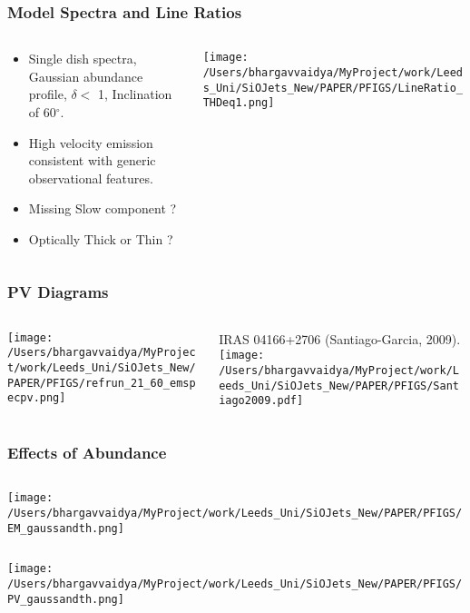 \documentclass[8pt,xcolor=dvipsnames]{beamer}
\begin{document}
\begin{frame}
\frametitle{Model Spectra and Line Ratios}
\begin{columns}[T]
\begin{column}{0.4\textwidth}
\begin{itemize}
\item Single dish spectra, Gaussian
  abundance profile, $\delta <$ 1, Inclination of 60$^{\circ}$. \\
\item High velocity emission consistent with generic observational features. \\
\item Missing Slow component ?
\item Optically Thick or Thin ?\\
\end{itemize}
\end{column}
\begin{column}{0.6\textwidth}
\texttt{[image: /Users/bhargavvaidya/MyProject/work/Leeds\_Uni/SiOJets\_New/PAPER/PFIGS/LineRatio\_THDeq1.png]}
\end{column}
\end{columns}
\end{frame}

\begin{frame}
\frametitle{PV Diagrams}
\begin{columns}[T]
\begin{column}{0.5\textwidth}
\texttt{[image: /Users/bhargavvaidya/MyProject/work/Leeds\_Uni/SiOJets\_New/PAPER/PFIGS/refrun\_21\_60\_emspecpv.png]}
\end{column}
\begin{column}{0.5\textwidth}
IRAS 04166+2706 (\alert{Santiago-Garcia, 2009}). 
\texttt{[image: /Users/bhargavvaidya/MyProject/work/Leeds\_Uni/SiOJets\_New/PAPER/PFIGS/Santiago2009.pdf]}
\end{column}
\end{columns}

\end{frame}

\begin{frame}[c]
\frametitle{Effects of Abundance}
\begin{columns}[c]
\begin{column}{0.9\textwidth}
\texttt{[image: /Users/bhargavvaidya/MyProject/work/Leeds\_Uni/SiOJets\_New/PAPER/PFIGS/EM\_gaussandth.png]}
\end{column}
\end{columns}
\vskip10pt
\begin{columns}[c]
\begin{column}{0.9\textwidth}
\texttt{[image: /Users/bhargavvaidya/MyProject/work/Leeds\_Uni/SiOJets\_New/PAPER/PFIGS/PV\_gaussandth.png]}
\end{column}
\end{columns}

\end{frame}
\end{document}
